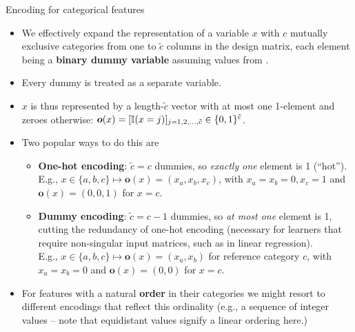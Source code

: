 \begin{vbframe}{Encoding for categorical features}

\begin{itemize}
  \small
  \item We effectively expand the representation of a variable $x$
  with $c$ mutually exclusive categories from one to $\tilde c$ columns in the 
  design matrix, each element being a \textbf{binary dummy variable} assuming 
  values from \setzo.
  \item Every dummy is treated as a separate variable.
  \item $x$ is thus represented by a length-$\tilde c$ vector with at most one 
  1-element and zeroes otherwise: $\bm{o}(x) = [\mathbb{I}(x = j)]_{
  j = 1, 2, \dots, \tilde c} \in \{0,1\}^{\tilde c}$.
  \item Two popular ways to do this are
  \begin{itemize}
    \footnotesize
    \item \textbf{One-hot encoding}: $\tilde c = c$ dummies, so \textit{exactly 
    one} element is 1 (\enquote{hot}).
    E.g., $x \in \{ a, b, c\} \mapsto \bm{o}(x) = (x_a, x_b, x_c)$, with 
    $x_a = x_b = 0, x_c = 1$ and $\bm{o}(x) = (0, 0, 1)$ for $x = c$.
    \item \textbf{Dummy encoding}: $\tilde c = c - 1$ dummies, so 
    \textit{at most one} element is 1, cutting the redundancy of one-hot 
    encoding (necessary for learners that require non-singular input matrices, 
    such as in linear regression). \\
    E.g., $x \in \{ a, b, c\} \mapsto \bm{o}(x) = (x_a, x_b)$ for reference 
    category $c$, with $x_a = x_b = 0$ and $\bm{o}(x) = (0, 0)$ for $x = c$.
  \end{itemize} 
  \item For features with a natural \textbf{order} in their categories we might 
  resort to different encodings that reflect this ordinality (e.g., a sequence 
  of integer values -- note that equidistant values signify a linear ordering 
  here.)
\end{itemize}

\end{vbframe}


